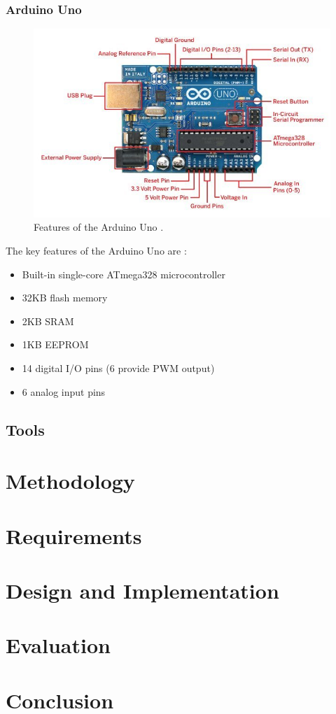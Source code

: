 \documentclass{UoYCSproject}
\begin{document}
\subsection{Arduino Uno}
\begin{figure}[H]
  \includegraphics[width=\linewidth]{graphics/arduino_board.jpg}
  \caption{Features of the Arduino Uno \parencite{arduinodiagram}.}
  \label{fig:arduino_uno}
\end{figure}

The key features of the Arduino Uno are \parencite{arduinospec}:
\begin{itemize}
\item Built-in single-core ATmega328 microcontroller
\item 32KB flash memory
\item 2KB SRAM
\item 1KB EEPROM
\item 14 digital I/O pins (6 provide PWM output)
\item 6 analog input pins
\end{itemize}


\section{Tools}

\chapter{Methodology}

\chapter{Requirements}

\chapter{Design and Implementation}

\chapter{Evaluation}

\chapter{Conclusion}

\printbibliography
\end{document}
